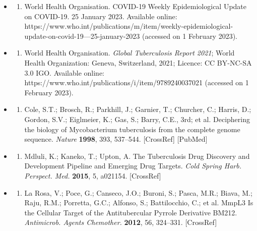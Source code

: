 \documentclass{article}
\begin{document}
\begin{itemize}
\begin{enumerate}
\end{enumerate}

\item \begin{enumerate}
\item 
World Health Organisation. COVID-19 Weekly Epidemiological Update on COVID-19. 25 January 2023. Available online: https://www.who.int/publications/m/item/weekly-epidemiological-update-on-covid-19---25-january-2023 (accessed on 1 February 2023).

\end{enumerate}

\item \begin{enumerate}
\item 
World Health Organisation. \textit{Global Tuberculosis Report 2021}; World Health Organization: Geneva, Switzerland, 2021; Licence: CC BY-NC-SA 3.0 IGO. Available online: https://www.who.int/publications/i/item/9789240037021 (accessed on 1 February 2023).

\end{enumerate}

\item \begin{enumerate}
\item 
Cole, S.T.; Brosch, R.; Parkhill, J.; Garnier, T.; Churcher, C.; Harris, D.; Gordon, S.V.; Eiglmeier, K.; Gas, S.; Barry, C.E., 3rd; et al. Deciphering the biology of Mycobacterium tuberculosis from the complete genome sequence. \textit{Nature} \textbf{1998}, 393, 537–544. [CrossRef] [PubMed]

\end{enumerate}

\item \begin{enumerate}
\item 
Mdluli, K.; Kaneko, T.; Upton, A. The Tuberculosis Drug Discovery and Development Pipeline and Emerging Drug Targets. \textit{Cold Spring Harb. Perspect. Med.} \textbf{2015}, 5, a021154. [CrossRef]

\end{enumerate}

\item \begin{enumerate}
\item 
La Rosa, V.; Poce, G.; Canseco, J.O.; Buroni, S.; Pasca, M.R.; Biava, M.; Raju, R.M.; Porretta, G.C.; Alfonso, S.; Battilocchio, C.; et al. MmpL3 Is the Cellular Target of the Antitubercular Pyrrole Derivative BM212. \textit{Antimicrob. Agents Chemother.} \textbf{2012}, 56, 324–331. [CrossRef]


\end{enumerate}
\end{itemize}
\end{document}
